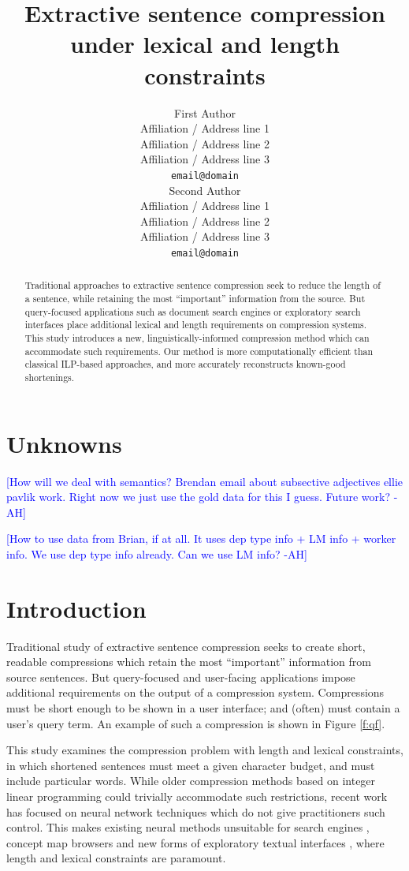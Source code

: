 \documentclass[11pt,a4paper]{article}
\title{Extractive sentence compression under lexical and length constraints}
\author{First Author \\
  Affiliation / Address line 1 \\
  Affiliation / Address line 2 \\
  Affiliation / Address line 3 \\
  {\tt email@domain} \\\And
  Second Author \\
  Affiliation / Address line 1 \\
  Affiliation / Address line 2 \\
  Affiliation / Address line 3 \\
  {\tt email@domain} \\}
\date{}
\newcommand{\ahcomment}[1]{\textcolor{blue}{[#1 -AH]}}
\begin{document}
\maketitle

\begin{abstract}
Traditional approaches to extractive sentence compression seek to reduce the length of a sentence, while retaining the most ``important'' information from the source. But query-focused applications such as document search engines or exploratory search interfaces place additional lexical and length requirements on compression systems. This study introduces a new, linguistically-informed compression method which can accommodate such requirements.  Our method is more computationally efficient than classical ILP-based approaches, and more accurately reconstructs known-good shortenings.
\end{abstract}

\section{Unknowns}

\ahcomment{How will we deal with semantics? Brendan email about subsective adjectives ellie pavlik work. Right now we just use the gold data for this I guess. Future work?}

\ahcomment{How to use data from Brian, if at all. It uses dep type info + LM info + worker info. We use dep type info already. Can we use LM info?}

\section{Introduction}

Traditional study of extractive sentence compression seeks to create short, readable compressions which retain the most ``important'' information from source sentences. But query-focused and user-facing applications impose additional requirements on the output of a compression system. Compressions must be short enough to be shown in a user interface; and (often) must contain a user's query term. An example of such a compression is shown in Figure \ref{f:qf}.

This study examines the compression problem with length and lexical constraints, in which shortened sentences must meet a given character budget, and must include particular words. While older compression methods based on integer linear programming could trivially accommodate such restrictions, recent work has focused on neural network techniques \cite{filippova2015sentence} which do not give practitioners such control. This makes existing neural methods unsuitable for search engines \cite{hearst2009search}, concept map browsers \cite{falke2017graphdocexplore} and new forms of exploratory textual interfaces \cite{marchionini2006exploratory}, where length and lexical constraints are paramount. 
\end{document}
